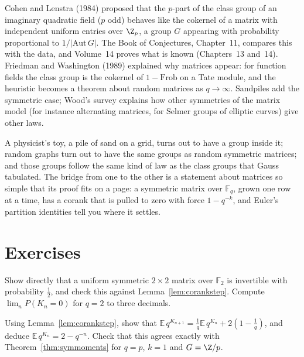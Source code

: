 \begin{remark}\label{rem:cohenlenstra}
Cohen and Lenstra (1984) proposed that the $p$-part of the class group of an imaginary quadratic field ($p$ odd) behaves like the cokernel of a matrix with independent uniform entries over $\Z_p$, a group $G$ appearing with probability proportional to $1/|\mathrm{Aut}\,G|$. The Book of Conjectures, Chapter~11, compares this with the data, and Volume~14 proves what is known (Chapters~13 and~14). Friedman and Washington (1989) explained why matrices appear: for function fields the class group is the cokernel of $1-\mathrm{Frob}$ on a Tate module, and the heuristic becomes a theorem about random matrices as $q\to\infty$. Sandpiles add the symmetric case; Wood's survey explains how other symmetries of the matrix model (for instance alternating matrices, for Selmer groups of elliptic curves) give other laws.
\end{remark}

\begin{beauty}
A physicist's toy, a pile of sand on a grid, turns out to have a group inside it; random graphs turn out to have the same groups as random symmetric matrices; and those groups follow the same kind of law as the class groups that Gauss tabulated. The bridge from one to the other is a statement about matrices so simple that its proof fits on a page: a symmetric matrix over $\mathbb F_q$, grown one row at a time, has a corank that is pulled to zero with force $1-q^{-k}$, and Euler's partition identities tell you where it settles.
\end{beauty}

\section{Exercises}

\begin{exercise}[$\star$]\label{ex:fullrank}
Show directly that a uniform symmetric $2\times2$ matrix over $\mathbb F_2$ is invertible with probability $\frac12$, and check this against Lemma~\ref{lem:corankstep}. Compute $\lim_nP(K_n=0)$ for $q=2$ to three decimals.
\end{exercise}

\begin{exercise}[$\star$]\label{ex:emoment}
Using Lemma~\ref{lem:corankstep}, show that $\mathbb E\,q^{K_{n+1}}=\frac1q\mathbb E\,q^{K_n}+2(1-\frac1q)$, and deduce $\mathbb E\,q^{K_n}=2-q^{-n}$. Check that this agrees exactly with Theorem~\ref{thm:symmoments} for $q=p$, $k=1$ and $G=\Z/p$.
\end{exercise}

